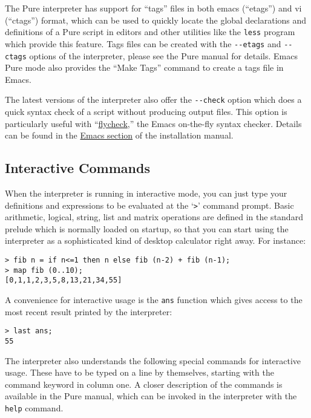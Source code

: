 \documentclass[a4paper,12pt]{article}
\begin{document}
The Pure interpreter has support for ``tags'' files in both emacs (``etags'') and vi (``ctags'') format, which can be used to quickly locate the global declarations and definitions of a Pure script in editors and other utilities like the \verb|less| program which provide this feature. Tags files can be created with the \verb|--etags| and \verb|--ctags| options of the interpreter, please see the Pure manual for details. Emacs Pure mode also provides the ``Make Tags'' command to create a tags file in Emacs.

The latest versions of the interpreter also offer the \verb|--check| option which does a quick syntax check of a script without producing output files. This option is particularly useful with ``\href{http://www.flycheck.org/}{flycheck},'' the Emacs on-the-fly syntax checker. Details can be found in the \href{https://agraef.github.io/pure-docs/install.html#emacs-pure-mode}{Emacs section} of the installation manual.

\subsection{Interactive Commands}
\label{Interactive}

When the interpreter is running in interactive mode, you can just type your definitions and expressions to be evaluated at the `\verb|>|' command prompt. Basic arithmetic, logical, string, list and matrix operations are defined in the standard prelude which is normally loaded on startup, so that you can start using the interpreter as a sophisticated kind of desktop calculator right away. For instance:

\begin{lstlisting}
> fib n = if n<=1 then n else fib (n-2) + fib (n-1);
> map fib (0..10);
[0,1,1,2,3,5,8,13,21,34,55]
\end{lstlisting}

A convenience for interactive usage is the \verb|ans| function which gives access to the most recent result printed by the interpreter:

\begin{lstlisting}
> last ans;
55
\end{lstlisting}

The interpreter also understands the following special commands for interactive usage. These have to be typed on a line by themselves, starting with the command keyword in column one. A closer description of the commands is available in the Pure manual, which can be invoked in the interpreter with the \verb|help| command.
\end{document}

